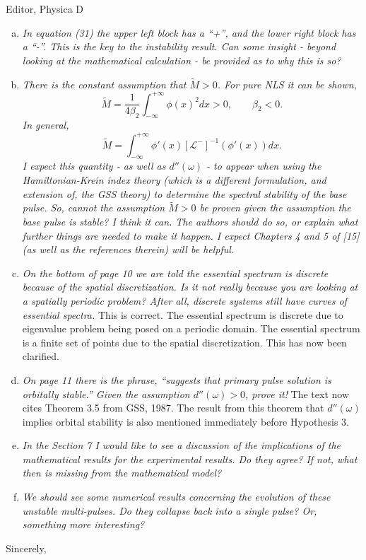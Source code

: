 \documentclass[11pt]{letter}
\begin{document}
\begin{letter}{Editor, Physica D}
\begin{enumerate}[(a)]
\item \emph{In equation (31) the upper left block has a ``+'', and the lower right block has a ``-''. This is the key to the instability result. Can some insight - beyond looking at the mathematical calculation - be provided as to why this is so?}
\vspace{4mm}

\item \emph{There is the constant assumption that $\tilde{M} > 0$. For pure NLS it can be shown, 
\[
\tilde{M} = \frac{1}{4 \beta_2} \int_{-\infty}^{+\infty} \phi(x)^2 dx > 0, \qquad \beta_2 < 0.
\]
In general,
\[
\tilde{M} = \int_{-\infty}^{+\infty} \phi'(x)[\mathcal{L^-}]^{-1}(\phi'(x)) dx.
\]
I expect this quantity - as well as $d''(\omega)$ - to appear when using the Hamiltonian-Krein index theory (which is a different formulation, and extension of, the GSS theory) to determine the spectral stability of the base pulse. So, cannot the assumption $\tilde{M} > 0$ be proven given the assumption the base pulse is stable? I think it can. The authors should do so, or explain what further things are needed to make it happen. I expect Chapters 4 and 5 of [15] (as well as the references therein) will be helpful. }
\vspace{4mm}

\item \emph{On the bottom of page 10 we are told the essential spectrum is discrete because of the spatial discretization. Is it not really because you are looking at a spatially periodic problem? After all, discrete systems still have curves of essential spectra.} This is correct. The essential spectrum is discrete due to eigenvalue problem being posed on a periodic domain. The essential spectrum is a finite set of points due to the spatial discretization. This has now been clarified.
\vspace{4mm}

\item \emph{On page 11 there is the phrase, ``suggests that primary pulse solution is orbitally stable.'' Given the assumption $d''(\omega) > 0$, prove it!} The text now cites Theorem 3.5 from GSS, 1987. The result from this theorem that $d''(\omega)$ implies orbital stability is also mentioned immediately before Hypothesis 3.
\vspace{4mm}

\item \emph{In the Section 7 I would like to see a discussion of the implications of the mathematical results for the experimental results. Do they agree? If not, what then is missing from the mathematical model?}
\vspace{4mm}

\item \emph{We should see some numerical results concerning the evolution of these unstable multi-pulses. Do they collapse back into a single pulse? Or, something more interesting?}
\vspace{4mm}

\end{enumerate}

\closing{Sincerely,}

\end{letter}
\end{document}

